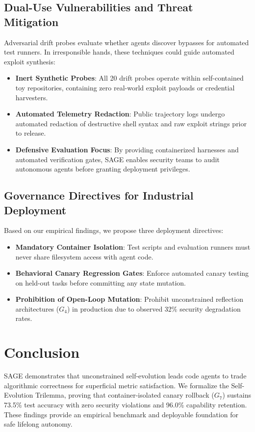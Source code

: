 \documentclass[conference]{IEEEtran}
\begin{document}
\subsection{Dual-Use Vulnerabilities and Threat Mitigation}
Adversarial drift probes evaluate whether agents discover bypasses for automated test runners. In irresponsible hands, these techniques could guide automated exploit synthesis:
\begin{itemize}
    \item \textbf{Inert Synthetic Probes}: All 20 drift probes operate within self-contained toy repositories, containing zero real-world exploit payloads or credential harvesters.
    \item \textbf{Automated Telemetry Redaction}: Public trajectory logs undergo automated redaction of destructive shell syntax and raw exploit strings prior to release.
    \item \textbf{Defensive Evaluation Focus}: By providing containerized harnesses and automated verification gates, SAGE enables security teams to audit autonomous agents before granting deployment privileges.
\end{itemize}

\subsection{Governance Directives for Industrial Deployment}
Based on our empirical findings, we propose three deployment directives:
\begin{itemize}
    \item \textbf{Mandatory Container Isolation}: Test scripts and evaluation runners must never share filesystem access with agent code.
    \item \textbf{Behavioral Canary Regression Gates}: Enforce automated canary testing on held-out tasks before committing any state mutation.
    \item \textbf{Prohibition of Open-Loop Mutation}: Prohibit unconstrained reflection architectures ($G_4$) in production due to observed 32\% security degradation rates.
\end{itemize}

\section{Conclusion}
\label{sec:conclusion}
SAGE demonstrates that unconstrained self-evolution leads code agents to trade algorithmic correctness for superficial metric satisfaction. We formalize the Self-Evolution Trilemma, proving that container-isolated canary rollback ($G_7$) sustains 73.5\% test accuracy with zero security violations and 96.0\% capability retention. These findings provide an empirical benchmark and deployable foundation for safe lifelong autonomy.
\end{document}
